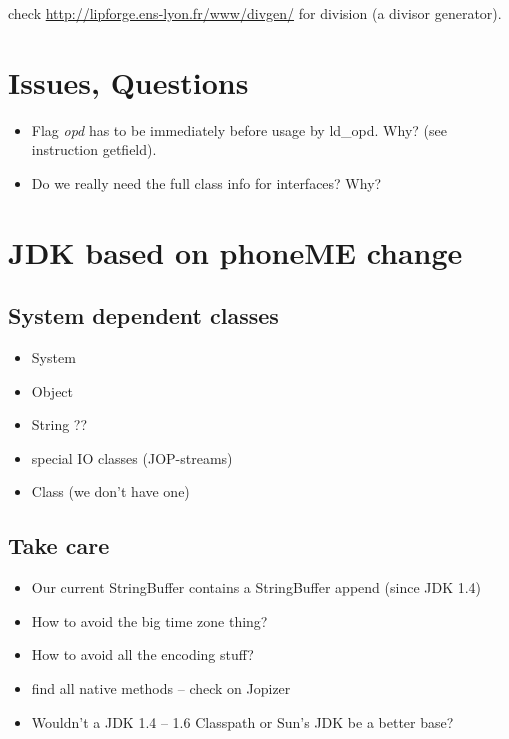 \documentclass[a4paper,12pt]{scrartcl}
\begin{document}
check \url{http://lipforge.ens-lyon.fr/www/divgen/} for division (a
divisor generator).

\section{Issues, Questions}

\begin{itemize}
    \item Flag \emph{opd} has to be immediately before usage by ld\_opd.
    Why? (see instruction getfield).
    \item Do we really need the full class info for interfaces? Why?
\end{itemize}

\section{JDK based on phoneME change}

\subsection{System dependent classes}

\begin{itemize}
  \item System
  \item Object
  \item String ??
  \item special IO classes (JOP-streams)
  \item Class (we don't have one)
\end{itemize}

\subsection{Take care}

\begin{itemize}
  \item Our current StringBuffer contains a StringBuffer append
      (since JDK 1.4)
  \item How to avoid the big time zone thing?
  \item How to avoid all the encoding stuff?
  \item find all native methods -- check on Jopizer
  \item Wouldn't a JDK 1.4 -- 1.6 Classpath or Sun's JDK be a
      better base?
\end{itemize}
\end{document}
